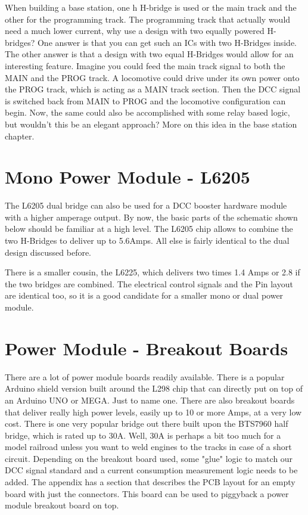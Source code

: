 When building a base station, one h
H-bridge is used or the main track and the other for the programming track. The programming track that actually would need a much lower current, why use a design with two equally powered H-bridges? One answer is that you can get such an ICs with two H-Bridges inside. The other answer is that a design with two equal H-Bridges would allow for an interesting feature. Imagine you could feed the main track signal to both the MAIN and the PROG track. A locomotive could drive under its own power onto the PROG track, which is acting as a MAIN track section. Then the DCC signal is switched back from MAIN to PROG and the locomotive configuration can begin. Now, the same could also be accomplished with some relay based logic, but wouldn't this be an elegant approach? More on this idea in the base station chapter.

\section{Mono Power Module - L6205}

The L6205 dual bridge can also be used for a DCC booster hardware module with a higher amperage output. By now, the basic parts of the schematic shown below should be familiar at a high level. The L6205 chip allows to combine the two H-Bridges to deliver up to 5.6Amps. All else is fairly identical to the dual design discussed before.

\FloatBarrier

There is a smaller cousin, the L6225, which delivers two times 1.4 Amps or 2.8 if the two bridges are combined. The electrical control signals and the Pin layout are identical too, so it is a good candidate for a smaller mono or dual power module.

\section{Power Module - Breakout Boards}

There are a lot of power module boards readily available. There is a popular Arduino shield version built around the L298 chip that can directly put on top of an Arduino UNO or MEGA. Just to name one. There are also breakout boards that deliver really high power levels, easily up to 10 or more Amps, at a very low cost. There is one very popular bridge out there built upon the BTS7960 half bridge, which is rated up to 30A. Well, 30A is perhaps a bit too much for a model railroad unless you want to weld engines to the tracks in case of a short circuit. Depending on the breakout board used, some "glue" logic to match our DCC signal standard and a current consumption measurement logic needs to be added. The appendix has a section that describes the PCB layout for an empty board with just the connectors. This board can be used to piggyback a power module breakout board on top.

